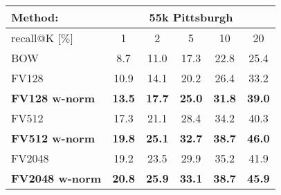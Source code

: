 \begin{table}[t!]
\begin{centering}
	\begin{tabularx}{0.89\linewidth}{|l|c c c c c|}
		\hline 
		\rowcolor{maroon!50}
		Method: & \multicolumn{5}{c|}{55k Pittsburgh} \\
		\hline 
		\hline 
		\rowcolor{maroon!50}
		recall@K [$\%$] & 1 & 2 & 5 & 10 & 20\\
		\hline
		\rowcolor{maroon!10}
		BOW       & 8.7 & 11.0 & 17.3 & 22.8 & 25.4  \\
    \hline
		\rowcolor{maroon!10}
		FV128     & 10.9 & 14.1 & 20.2 & 26.4 & 33.2 \\
		\rowcolor{maroon!10}
		\textbf{FV128 w-norm}  & \textbf{13.5}  &  \textbf{17.7}  &  \textbf{25.0}  &  \textbf{31.8}  &  \textbf{39.0} \\
    \hline  
    \rowcolor{maroon!10}
    FV512   & 17.3 &  21.1 &  28.4 &  34.2 &  40.3 \\      
    \rowcolor{maroon!10}
    \rowcolor{maroon!10}
    \textbf{FV512 w-norm}  & \textbf{19.8} &  \textbf{25.1} &  \textbf{32.7}  & \textbf{38.7} &  \textbf{46.0} \\
    \hline
		\rowcolor{maroon!10}
		FV2048        & 19.2 & 23.5 & 29.9 &  35.2 &  41.9 \\
		\rowcolor{maroon!10}
        \rowcolor{maroon!10}
        \textbf{FV2048 w-norm}  & \textbf{20.8} & \textbf{25.9} & \textbf{33.1} & \textbf{38.7} & \textbf{45.9} \\
        \hline

\end{tabularx}
\end{centering}
\end{table}
